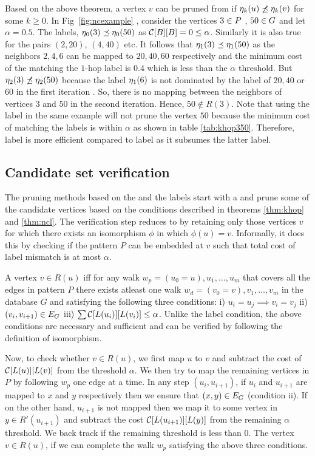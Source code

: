 Based on the above theorem, a vertex $v$ can be pruned from \CR if $\eta_{k}(u)
\not\preceq \eta_{k}(v)$ for some $k \geq 0$. In Fig~\ref{fig:ncexample} ,
consider the vertices $3 \in P$ , $50 \in G$ and let $\alpha = 0.5$. The
\ncl labels, $\eta_{0}(3) \preceq \eta_{0}(50)$ as $\mathcal{C}[B][B] = 0 \leq
\alpha$.  Similarly it is also true for the pairs $(2, 20)$, $(4, 40)$ etc. It
follows that $\eta_{1}(3) \preceq \eta_{1}(50)$ as the neighbors $2, 4, 6$ can
be mapped to $20, 40, 60$ respectively and  the minimum cost of the matching the
$1$-hop label is $0.4$ which is less than the $\alpha$ threshold. But
$\eta_{2}(3) \not\preceq \eta_{2}(50)$ because the \ncl label $\eta_{1}(6)$
is not dominated by the \ncl label of $20, 40$ or  $60$ in the first
iteration . So, there is no mapping between the neighbors of vertices $3$ and
$50$ in the second iteration. Hence, $50 \notin R(3)$.
Note that using the \khop label in
the same example will not prune the vertex $50$ because the minimum cost of
matching the \khop labels is within $\alpha$ as shown in table
\ref{tab:khop350}. Therefore, \ncl label is more efficient compared to \khop
label as it subsumes the latter label.

\subsection{Candidate set verification} \label{sec:verification} The pruning
methods based on the \khop and the \ncl labels start with a \CR and prune some
of the candidate vertices based on the conditions described in theorems
\ref{thm:khop} and \ref{thm:ncl}.  The verification step reduces \CR to \RS by
retaining only those vertices $v$ for which there exists an isomorphism $\phi$ in
which $\phi(u) = v$.  Informally, it does this by checking if the pattern $P$ can be
embedded at $v$ such that total cost of label mismatch is at most $\alpha$.

A vertex $v \in R(u)$ iff for any walk $w_p = (u_0=u), u_1,\ldots,u_m$ that covers all
the edges in pattern $P$ there exists atleast one walk $w_d = (v_0=v), v_1,\ldots,
v_m$ in the database $G$ and satisfying the following three conditions: i) 
$u_i = u_j \implies v_i = v_j$ ii) $(v_i, v_{i+1}) \in E_G$
iii) $\sum\mathcal{C}[L(u_i)][L(v_i)] \leq \alpha$.
Unlike the \ncl label condition, the above conditions are necessary and
sufficient and can be verified by following the definition of isomorphism.

Now, to check whether $v \in R(u)$, we first map $u$ to $v$ and subtract the cost of
$\mathcal{C}[L(u)][L(v)]$ from the threshold $\alpha$. We then try to map the
remaining vertices in $P$ by following $w_p$ one edge at a time. In any step
$(u_i, u_{i+1})$, if $u_i$ and $u_{i+1}$ are mapped to $x$ and $y$ respectively
then we ensure that $(x, y) \in E_G$
(condition ii). If on the other hand, $u_{i+1}$ is not mapped then we map it
to some vertex in $y \in R'(u_{i+1})$ and subtract the cost
$\mathcal{C}[L(u_{i+1})][L(y)]$ from the remaining $\alpha$ threshold. We back
track if the remaining threshold is less than $0$. The vertex $v \in R(u)$, if we
can complete the walk $w_p$ satisfying the above three conditions.

